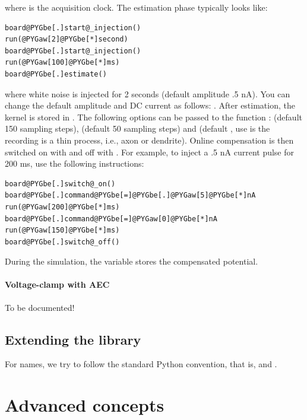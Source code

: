 \documentclass[letterpaper,10pt,english]{manual}
\begin{document}
where  is the acquisition clock. The estimation phase typically looks like:

\begin{Verbatim}[commandchars=@\[\]]
board@PYGbe[.]start@_injection()
run(@PYGaw[2]@PYGbe[*]second)
board@PYGbe[.]start@_injection()
run(@PYGaw[100]@PYGbe[*]ms)
board@PYGbe[.]estimate()
\end{Verbatim}

where white noise is injected for 2 seconds (default amplitude .5 nA).
You can change the default amplitude and DC current as follows:
.
After estimation, the kernel is stored in .
The following options can be passed to the function :
 (default 150 sampling steps),  (default 50 sampling steps)
and  (default , use  is the recording is a thin
process, i.e., axon or dendrite).
Online compensation is then switched on with 
and off with . For example, to inject a .5 nA current
pulse for 200 ms, use the following instructions:

\begin{Verbatim}[commandchars=@\[\]]
board@PYGbe[.]switch@_on()
board@PYGbe[.]command@PYGbe[=]@PYGbe[.]@PYGaw[5]@PYGbe[*]nA
run(@PYGaw[200]@PYGbe[*]ms)
board@PYGbe[.]command@PYGbe[=]@PYGaw[0]@PYGbe[*]nA
run(@PYGaw[150]@PYGbe[*]ms)
board@PYGbe[.]switch@_off()
\end{Verbatim}

During the simulation, the variable  stores the compensated
potential.


\subsubsection{Voltage-clamp with AEC}

To be documented!

\resetcurrentobjects


\section{Extending the library}

For names, we try to follow the standard Python convention, that is, 
and .

\resetcurrentobjects


\chapter{Advanced concepts}
\end{document}
